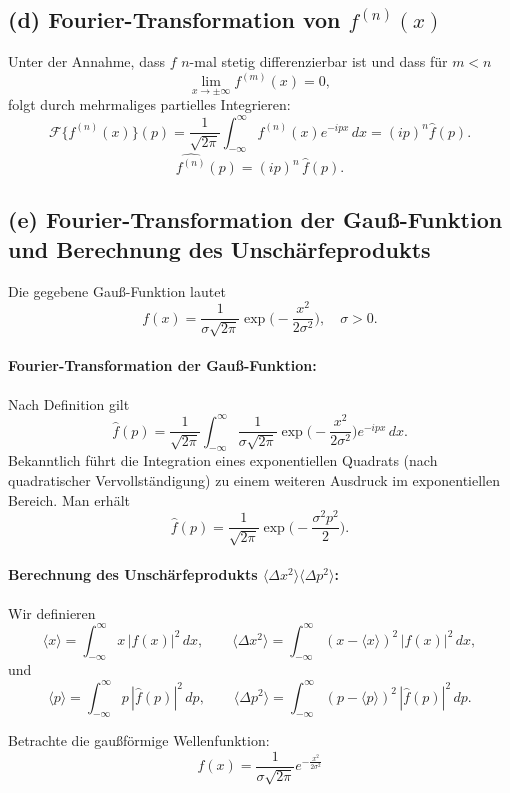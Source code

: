 \documentclass[a4paper,12pt]{article}
\begin{document}
\subsection*{(d) Fourier-Transformation von \( f^{(n)}(x) \)}

Unter der Annahme, dass \( f \) \( n \)-mal stetig differenzierbar ist und dass für \( m<n \)
\[
\lim_{x\to\pm\infty}f^{(m)}(x)=0,
\]
folgt durch mehrmaliges partielles Integrieren:
\[
\mathcal{F}\{f^{(n)}(x)\}(p)=\frac{1}{\sqrt{2\pi}}\int_{-\infty}^{\infty} f^{(n)}(x)e^{-ipx}\,dx = (ip)^n\hat{f}(p).
\]
\[
\boxed{\widehat{f^{(n)}}(p)=(ip)^n\,\hat{f}(p).}
\]

\subsection*{(e) Fourier-Transformation der Gauß-Funktion und Berechnung des Unschärfeprodukts}

Die gegebene Gauß-Funktion lautet
\[
f(x)=\frac{1}{\sigma\sqrt{2\pi}}\exp\!\Biggl(-\frac{x^2}{2\sigma^2}\Biggr),\quad \sigma>0.
\]

\paragraph{Fourier-Transformation der Gauß-Funktion:}

Nach Definition gilt
\[
\hat{f}(p)=\frac{1}{\sqrt{2\pi}}\int_{-\infty}^{\infty} \frac{1}{\sigma\sqrt{2\pi}}\exp\!\Biggl(-\frac{x^2}{2\sigma^2}\Biggr)e^{-ipx}\,dx.
\]
Bekanntlich führt die Integration eines exponentiellen Quadrats (nach quadratischer Vervollständigung) zu einem weiteren Ausdruck im exponentiellen Bereich. Man erhält
\[
\boxed{\hat{f}(p)=\frac{1}{\sqrt{2\pi}}\exp\!\Biggl(-\frac{\sigma^2p^2}{2}\Biggr).}
\]

\paragraph{Berechnung des Unschärfeprodukts \(\langle \Delta x^2\rangle\langle \Delta p^2\rangle\):}

Wir definieren
\[
\langle x\rangle = \int_{-\infty}^{\infty} x\,|f(x)|^2\,dx,\qquad
\langle \Delta x^2\rangle = \int_{-\infty}^{\infty} (x-\langle x\rangle)^2\,|f(x)|^2\,dx,
\]
und
\[
\langle p\rangle = \int_{-\infty}^{\infty} p\,|\hat{f}(p)|^2\,dp,\qquad
\langle \Delta p^2\rangle = \int_{-\infty}^{\infty} (p-\langle p\rangle)^2\,|\hat{f}(p)|^2\,dp.
\]

Betrachte die gaußförmige Wellenfunktion:
\[
f(x) = \frac{1}{\sigma \sqrt{2\pi}} e^{-\frac{x^2}{2\sigma^2}}
\]
\end{document}
